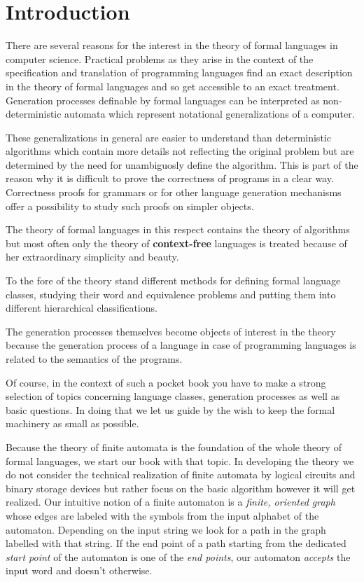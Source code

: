 \chapter*{Introduction}

There are several reasons for the interest in the theory of formal languages in
computer science. Practical problems as they arise in the context of the
specification and translation of programming languages find an exact
description in the theory of formal languages and so get accessible to an exact
treatment. Generation processes definable by formal languages can be interpreted as 
non-deterministic automata which represent notational generalizations of a
computer.

These generalizations in general are easier to understand than
deterministic algorithms which contain more details not reflecting the
original problem but are determined by the need for unambiguosly define the
algorithm. This is part of the reason why it is difficult to prove the
correctness of programs in a clear way. Correctness proofs for grammars or
for other language generation mechanisms offer a possibility to study such
proofs on simpler objects.

The theory of formal languages in this respect contains the theory of
algorithms but most often only the theory of {\bf context-free} languages is
treated because of her extraordinary simplicity and beauty.

To the fore of the theory stand different methods for defining
formal language classes, studying their word and equivalence problems and
putting them into different hierarchical classifications.

The generation processes themselves become objects of interest in the theory
because the generation process of a language in case of programming languages
is related to the semantics of the programs.

Of course, in the context of such a pocket book you have to make a strong
selection of topics concerning language classes, generation processes as well as
basic questions. In doing that we let us guide by the wish to keep the
formal machinery as small as possible.


Because the theory of finite automata is the foundation of the whole theory of
formal languages, we start our book with that topic. In developing the theory
we do not consider the technical realization of finite automata by logical
circuits and binary storage devices but rather focus on the basic algorithm 
however it will get realized. Our intuitive notion of a finite automaton
is a {\em finite, oriented graph} whose edges are labeled with the symbols from
the input alphabet of the automaton. Depending on the input string we look for a
 path in the graph labelled with that string. If the end point of a path
 starting from the dedicated {\em start point} of the automaton is one of the
 {\em end points}, our automaton {\em accepts} the input word and doesn't
 otherwise.


